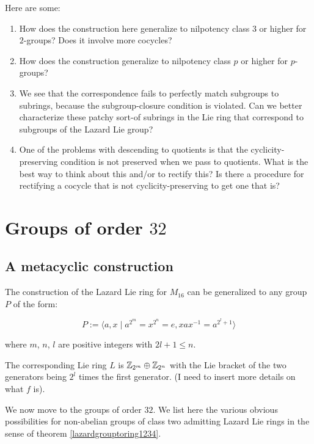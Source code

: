 \documentclass[10pt]{amsart}
\begin{document}
Here are some:

\begin{enumerate}
\item How does the construction here generalize to nilpotency class
  $3$ or higher for $2$-groups? Does it involve more cocycles?
\item How does the construction generalize to nilpotency class $p$ or
  higher for $p$-groups?
\item We see that the correspondence fails to perfectly match
  subgroups to subrings, because the subgroup-closure condition is
  violated. Can we better characterize these patchy sort-of subrings
  in the Lie ring that correspond to subgroups of the Lazard Lie group?
\item One of the problems with descending to quotients is that the
  cyclicity-preserving condition is not preserved when we pass to
  quotients. What is the best way to think about this and/or to
  rectify this? Is there a procedure for rectifying a cocycle that is
  not cyclicity-preserving to get one that is?
\end{enumerate}

\section{Groups of order $32$}

\subsection{A metacyclic construction}

The construction of the Lazard Lie ring for $M_{16}$ can be
generalized to any group $P$ of the form:

$$P := \langle a,x \mid a^{2^m} = x^{2^n} = e, xax^{-1} = a^{2^l + 1} \rangle$$

where $m$, $n$, $l$ are positive integers with $2l + 1 \le n$.

The corresponding Lie ring $L$ is $\mathbb{Z}_{2^m} \oplus \mathbb{Z}_{2^n}$ with the
Lie bracket of the two generators being $2^l$ times the first
generator. (I need to insert more details on what $f$ is).

We now move to the groups of order $32$. We list here the various
obvious possibilities for non-abelian groups of class two admitting
Lazard Lie rings in the sense of theorem \ref{lazardgrouptoring1234}.
\end{document}
